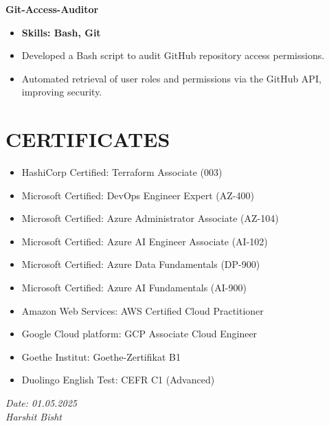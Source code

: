 \documentclass[11pt,a4paper]{article}
\newenvironment{dashlist}{
  \begin{itemize}[label={--}]
}{
  \end{itemize}
}
\begin{document}
\noindent\textbf{Git-Access-Auditor}
\begin{itemize}
\item \textbf{Skills: Bash, Git}
\end{itemize}
\begin{dashlist}
    \item Developed a Bash script to audit GitHub repository access permissions.
    \item Automated retrieval of user roles and permissions via the GitHub API, improving security.
\end{dashlist}

\section*{CERTIFICATES}
\begin{itemize}
    \item HashiCorp Certified: Terraform Associate (003)
    \item Microsoft Certified: DevOps Engineer Expert (AZ-400)
    \item Microsoft Certified: Azure Administrator Associate (AZ-104)
    \item Microsoft Certified: Azure AI Engineer Associate (AI-102)
    \item Microsoft Certified: Azure Data Fundamentals (DP-900)
    \item Microsoft Certified: Azure AI Fundamentals (AI-900)
    \item Amazon Web Services: AWS Certified Cloud Practitioner
    \item Google Cloud platform: GCP Associate Cloud Engineer
    \item Goethe Institut: Goethe-Zertifikat B1
    \item Duolingo English Test: CEFR C1 (Advanced)
\end{itemize}


\vfill %
\noindent %
\begin{flushright} %
    \textit{Date: 01.05.2025}\\ %
    \textit{Harshit Bisht} %
\end{flushright}
\end{document}
